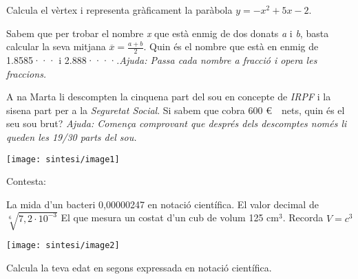 \begin{mylist}
	 \exer[2] Calcula el vèrtex i representa gràficament la paràbola $y=-x^2+5x-2$.
	 
 	
		\exer[2]  Sabem que per trobar el nombre \textit{x} que està enmig de dos donats \textit{a} i \textit{b}, basta calcular la seva mitjana $\overline{x}=\frac{a+b}{2}$. Quin és el nombre que està en enmig de 1.8585··· i 2.888····.\textit{Ajuda: Passa cada nombre a fracció i opera les fraccions.}
	
	\vspace*{-1.5cm}
	\exer[2] \begin{minipage}[t]{0.7\textwidth}
		A na Marta li descompten la cinquena part del sou en concepte de \textit{IRPF} i la sisena part per a la \textit{Seguretat Social}. Si sabem que cobra 600 \euro\ \ nets, quin és el seu sou brut? \textit{Ajuda: Comença comprovant que després dels descomptes només li queden les 19/30 parts del sou.}
	\end{minipage}
	\begin{minipage}{0.3\textwidth}
		\centering
		\vspace{1.5cm}
		\texttt{[image: sintesi/image1]}
	\end{minipage}
	
 \vspace{-1.5cm}
 \exer[2] \begin{minipage}[t]{0.7\textwidth}
 	 Contesta:
 	 \begin{tasks}
 	 	\task La mida d'un bacteri 0,00000247 en notació científica.
 	 	\task El valor decimal de $\sqrt[6]{7,2\cdot {10}^{-3}}$
 	 	\task  El que mesura un costat d'un cub de volum 125 cm${}^{3}$. Recorda $V=c^3$
 	 \end{tasks}
 \end{minipage}
 \begin{minipage}{0.3\textwidth}
 	\centering
 	\vspace{1.5cm}
 	\texttt{[image: sintesi/image2]}
 \end{minipage}
 
	
 
	
	
		\exer[2]  Calcula la teva edat en segons expressada en notació científica.
	

\end{mylist}
